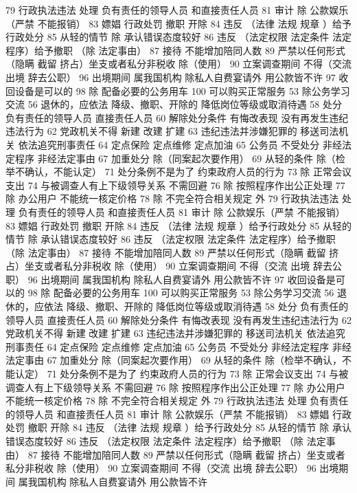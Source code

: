 \documentclass[11pt]{ctexart}
\begin{document}
79 行政执法违法 处理
负有责任的领导人员
和直接责任人员
81 审计
除 公款娱乐（严禁 不能报销）
83 嫖娼 行政处罚
撤职 开除
84 违反 （法律 法规 规章 ）给予行政处分
85 从轻的情节
除 承认错误态度较好
86 违反 （法定权限 法定条件 法定程序）给予撤职
（除 法定事由）
87 接待 不能增加陪同人数
89 严禁以任何形式（隐瞒 截留 挤占）坐支或者私分非税收
除（使用）
90 立案调查期间 不得（交流 出境 辞去公职）
96 出境期间 属我国机构 除私人自费宴请外 用公款皆不许
97 收回设备是可以的
98 除 配备必要的公务用车
100 可以购买正常服务
53 除公务学习交流
56 退休的，应依法
降级、撤职、开除的 降低岗位等级或取消待遇
58 处分
负有责任的领导人员
直接责任人员
60 解除处分条件
有悔改表现
没有再发生违纪违法行为
62 党政机关不得
新建 改建 扩建
63 违纪违法并涉嫌犯罪的
移送司法机关
依法追究刑事责任
64 定点保险 定点维修 定点加油
65 公务员 不受处分
非经法定程序
非经法定事由
67 加重处分
除（同案起次要作用）
69 从轻的条件
除（检举不确认，不能认定）
71 处分条例不是为了
约束政府人员的行为
73 除 正常会议支出
74 与被调查人有上下级领导关系 不需回避
76 除 按照程序作出公正处理
77 除 办公用户
不能统一核定价格
78 除 不完全符合相关规定 外
79 行政执法违法 处理
负有责任的领导人员
和直接责任人员
81 审计
除 公款娱乐（严禁 不能报销）
83 嫖娼 行政处罚
撤职 开除
84 违反 （法律 法规 规章 ）给予行政处分
85 从轻的情节
除 承认错误态度较好
86 违反 （法定权限 法定条件 法定程序）给予撤职
（除 法定事由）
87 接待 不能增加陪同人数
89 严禁以任何形式（隐瞒 截留 挤占）坐支或者私分非税收
除（使用）
90 立案调查期间 不得（交流 出境 辞去公职）
96 出境期间 属我国机构 除私人自费宴请外 用公款皆不许
97 收回设备是可以的
98 除 配备必要的公务用车
100 可以购买正常服务
53 除公务学习交流
56 退休的，应依法
降级、撤职、开除的 降低岗位等级或取消待遇
58 处分
负有责任的领导人员
直接责任人员
60 解除处分条件
有悔改表现
没有再发生违纪违法行为
62 党政机关不得
新建 改建 扩建
63 违纪违法并涉嫌犯罪的
移送司法机关
依法追究刑事责任
64 定点保险 定点维修 定点加油
65 公务员 不受处分
非经法定程序
非经法定事由
67 加重处分
除（同案起次要作用）
69 从轻的条件
除（检举不确认，不能认定）
71 处分条例不是为了
约束政府人员的行为
73 除 正常会议支出
74 与被调查人有上下级领导关系 不需回避
76 除 按照程序作出公正处理
77 除 办公用户
不能统一核定价格
78 除 不完全符合相关规定 外
79 行政执法违法 处理
负有责任的领导人员
和直接责任人员
81 审计
除 公款娱乐（严禁 不能报销）
83 嫖娼 行政处罚
撤职 开除
84 违反 （法律 法规 规章 ）给予行政处分
85 从轻的情节
除 承认错误态度较好
86 违反 （法定权限 法定条件 法定程序）给予撤职
（除 法定事由）
87 接待 不能增加陪同人数
89 严禁以任何形式（隐瞒 截留 挤占）坐支或者私分非税收
除（使用）
90 立案调查期间 不得（交流 出境 辞去公职）
96 出境期间 属我国机构 除私人自费宴请外 用公款皆不许
\end{document}
